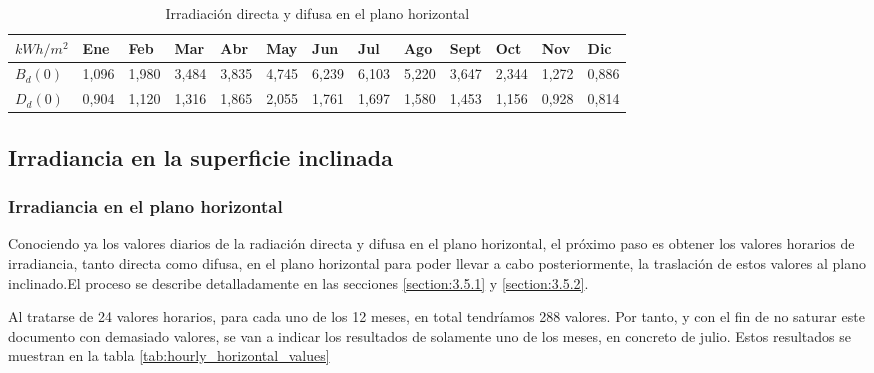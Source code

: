 \begin{table}[ht]
\centering
\begin{tabular}{|l|l|l|l|l|l|l|l|l|l|l|l|l|}
\hline
$kWh/m^2$  & Ene   & Feb   & Mar   & Abr   & May   & Jun   & Jul   & Ago   & Sept  & Oct   & Nov    & Dic    \\ \hline
$B_{d}(0)$ & 1,096 & 1,980 & 3,484 & 3,835 & 4,745 & 6,239 & 6,103 & 5,220 & 3,647 & 2,344 & 1,272  & 0,886  \\ \hline
$D_{d}(0)$ & 0,904 & 1,120 & 1,316 & 1,865 & 2,055 & 1,761 & 1,697 & 1,580 & 1,453 & 1,156 & 0,928  & 0,814  \\ \hline
\end{tabular}
\label{tab:rad_components}
\caption{Irradiación directa y difusa en el plano horizontal}
\end{table}

\subsection{Irradiancia en la superficie inclinada}

\subsubsection{Irradiancia en el plano horizontal}
Conociendo ya los valores diarios de la radiación directa y difusa en el plano horizontal, el próximo paso es obtener los valores horarios de irradiancia, tanto directa como difusa, en el plano horizontal para poder llevar a cabo posteriormente, la traslación de estos valores al plano inclinado.El proceso se describe detalladamente en las secciones \ref{section:3.5.1} y \ref{section:3.5.2}.

Al tratarse de 24 valores horarios, para cada uno de los 12 meses, en total tendríamos 288 valores. Por tanto, y con el fin de no saturar este documento con demasiado valores, se van a indicar los resultados de solamente uno de los meses, en concreto de julio. Estos resultados se muestran en la tabla \ref{tab:hourly_horizontal_values}

